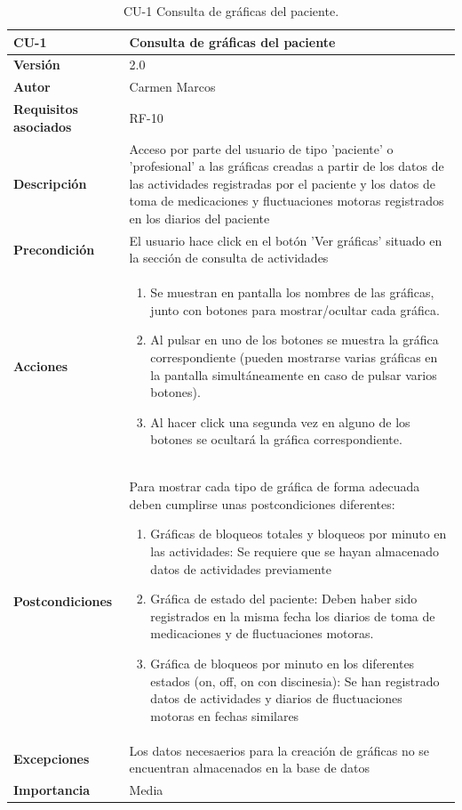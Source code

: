 \begin{table}[p]
	\centering
	\begin{tabularx}{\linewidth}{ p{} p{} }
		\toprule
		\textbf{CU-1}    & \textbf{Consulta de gráficas del paciente}\\
		\toprule
		\textbf{Versión}              & 2.0    \\
		\textbf{Autor}                & Carmen Marcos \\
		\textbf{Requisitos asociados} & RF-10 \\
		\textbf{Descripción}          & Acceso por parte del usuario de tipo 'paciente' o 'profesional' a las gráficas creadas a partir de los datos de las actividades registradas por el paciente y los datos de toma de medicaciones y fluctuaciones motoras registrados en los diarios del paciente \\
		\textbf{Precondición}         & El usuario hace click en el botón 'Ver gráficas' situado en la sección de consulta de actividades\\
		\textbf{Acciones}             &
		\begin{enumerate}
			\def\labelenumi{\arabic{enumi}.}
			\tightlist
			\item Se muestran en pantalla los nombres de las gráficas, junto con botones para mostrar/ocultar cada gráfica.
			\item Al pulsar en uno de los botones se muestra la gráfica correspondiente (pueden mostrarse varias gráficas en la pantalla simultáneamente en caso de pulsar varios botones).
                \item Al hacer click una segunda vez en alguno de los botones se ocultará la gráfica correspondiente.
		\end{enumerate}\\
		\textbf{Postcondiciones}        & Para mostrar cada tipo de gráfica de forma adecuada deben cumplirse unas postcondiciones diferentes:
  \begin{enumerate}
        \def\labelenumi{\arabic{enumi}.}
	\tightlist
      \item Gráficas de bloqueos totales y bloqueos por minuto en las actividades: Se requiere que se hayan almacenado datos de actividades previamente
      \item Gráfica de estado del paciente: Deben haber sido registrados en la misma fecha los diarios de toma de medicaciones y de fluctuaciones motoras.
      \item Gráfica de bloqueos por minuto en los diferentes estados (on, off, on con discinesia): Se han registrado datos de actividades y diarios de fluctuaciones motoras en fechas similares
  \end{enumerate}\\
		\textbf{Excepciones}          & Los datos necesaerios para la creación de gráficas no se encuentran almacenados en la base de datos \\
		\textbf{Importancia}          & Media \\
		\bottomrule
	\end{tabularx}
	\caption{CU-1 Consulta de gráficas del paciente.}
        \label{tab:CU-1}
\end{table}

